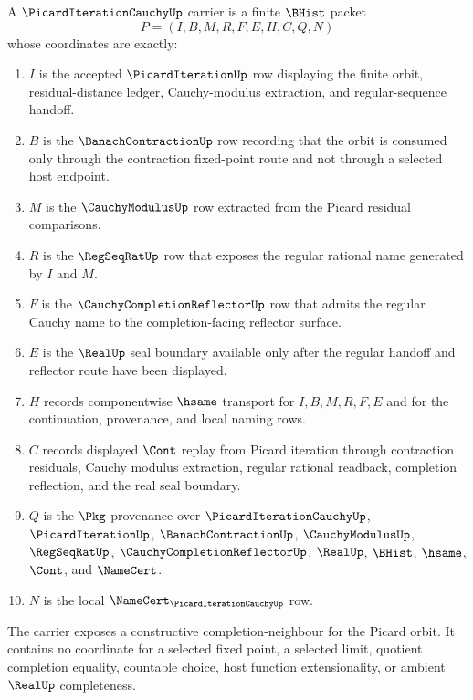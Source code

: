 \begin{definition}
\label{def:picard-iteration-cauchy-carrier}
A $\PicardIterationCauchyUp$ carrier is a finite $\BHist$ packet
$$
P=(I,B,M,R,F,E,H,C,Q,N)
$$
whose coordinates are exactly:
\begin{enumerate}
\item $I$ is the accepted $\PicardIterationUp$ row displaying the finite orbit, residual-distance ledger, Cauchy-modulus extraction, and regular-sequence handoff.
\item $B$ is the $\BanachContractionUp$ row recording that the orbit is consumed only through the contraction fixed-point route and not through a selected host endpoint.
\item $M$ is the $\CauchyModulusUp$ row extracted from the Picard residual comparisons.
\item $R$ is the $\RegSeqRatUp$ row that exposes the regular rational name generated by $I$ and $M$.
\item $F$ is the $\CauchyCompletionReflectorUp$ row that admits the regular Cauchy name to the completion-facing reflector surface.
\item $E$ is the $\RealUp$ seal boundary available only after the regular handoff and reflector route have been displayed.
\item $H$ records componentwise $\hsame$ transport for $I,B,M,R,F,E$ and for the continuation, provenance, and local naming rows.
\item $C$ records displayed $\Cont$ replay from Picard iteration through contraction residuals, Cauchy modulus extraction, regular rational readback, completion reflection, and the real seal boundary.
\item $Q$ is the $\Pkg$ provenance over $\PicardIterationCauchyUp$, $\PicardIterationUp$, $\BanachContractionUp$, $\CauchyModulusUp$, $\RegSeqRatUp$, $\CauchyCompletionReflectorUp$, $\RealUp$, $\BHist$, $\hsame$, $\Cont$, and $\NameCert$.
\item $N$ is the local $\NameCert_{\PicardIterationCauchyUp}$ row.
\end{enumerate}
The carrier exposes a constructive completion-neighbour for the Picard orbit. It contains no coordinate for a selected fixed point, a selected limit, quotient completion equality, countable choice, host function extensionality, or ambient $\RealUp$ completeness.
\end{definition}


